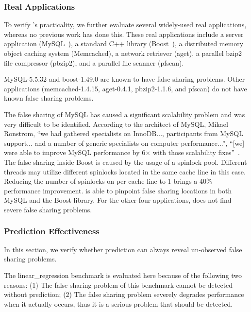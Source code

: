 \subsubsection{Real Applications}
To verify \Predator{}'s practicality, we further evaluate several widely-used real applications, whereas no previous work has done this. These real applications include a server application (MySQL~\cite{mysql}),
a standard C++ library (Boost~\cite{libfalsesharing}),
a distributed memory object caching system (Memcached), a network retriever (aget),
a parallel bzip2 file compressor (pbzip2), and a parallel file scanner (pfscan).

MySQL-5.5.32 and boost-1.49.0 are known to have false sharing problems. Other applications (memcached-1.4.15, aget-0.4.1,  pbzip2-1.1.6, and pfscan) do not have known false sharing problems.

The false sharing of MySQL has caused a significant scalability problem and was very difficult to be identified.
According to the architect of MySQL, Mikael Ronstrom, ``we had gathered specialists on InnoDB..., participants from MySQL support... and a number of generic specialists on 
computer performance...'', ``[we] were able to improve MySQL performance by 6$\times$ with those scalability fixes''~\cite{mysql}. 
The false sharing inside Boost is caused by the usage of a  spinlock pool. Different threads may utilize different spinlocks located in the same cache line in this case. Reducing the number of spinlocks on per cache line to 1 brings a 40\% performance improvement.
\Predator{} is able to pinpoint false sharing locations in both MySQL and the Boost library. 
For the other four applications, \Predator{} does not find severe false sharing problems.

\subsubsection{Prediction Effectiveness}
\label{sec:predicteval}
In this section, we verify whether prediction can always  reveal un-observed false sharing problems.

The linear\_regression benchmark is evaluated here because of the following two reasons: (1) The false sharing problem of this benchmark cannot be detected without prediction; (2) The false sharing problem severely degrades performance when it actually occurs, thus it is a serious problem that should be detected. 

